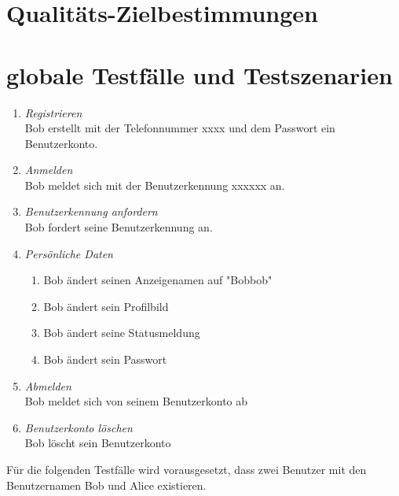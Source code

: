 \documentclass[parskip=full]{scrartcl}
\def\threedigits#1{%
  \ifnum#1<100 0\fi
  \ifnum#1<10 0\fi
  \number#1}
\begin{document}
\newpage
\section{Qualitäts-Zielbestimmungen}

\newpage
\section{globale Testfälle und Testszenarien}
\begin{enumerate}[label={\textbf{/T\protect\threedigits{\theenumi}0/}}, leftmargin=*]
	\item \textit{Registrieren} \\ Bob erstellt mit der Telefonnummer xxxx und dem Passwort ein Benutzerkonto.
	\item \textit{Anmelden} \\ Bob meldet sich mit der Benutzerkennung xxxxxx an.
	\item \textit{Benutzerkennung anfordern} \\ Bob fordert seine Benutzerkennung an.
	\item \textit{Persönliche Daten}
	\begin{enumerate}
		\item Bob ändert seinen Anzeigenamen auf "Bobbob"
		\item Bob ändert sein Profilbild
		\item Bob ändert seine Statusmeldung
		\item Bob ändert sein Passwort
	\end{enumerate}
	\item \textit{Abmelden} \\ Bob meldet sich von seinem Benutzerkonto ab
	\item \textit{Benutzerkonto löschen} \\ Bob löscht sein Benutzerkonto
\end{enumerate}
Für die folgenden Testfälle wird vorausgesetzt, dass zwei Benutzer mit den Benutzernamen Bob und Alice existieren.
\end{document}
